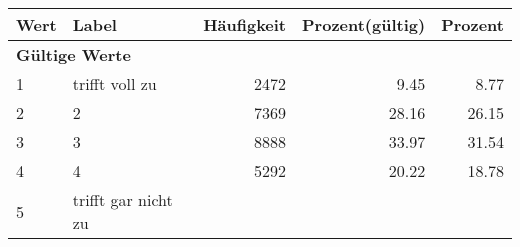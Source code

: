      \begin{longtable}{lXrrr}
     \toprule
     \textbf{Wert} & \textbf{Label} & \textbf{Häufigkeit} & \textbf{Prozent(gültig)} & \textbf{Prozent} \\
     \endhead
     \midrule
     \multicolumn{5}{l}{\textbf{Gültige Werte}}\\

     1 &
     \multicolumn{1}{X}{ trifft voll zu   } &


       \num{2472} &
       \num[round-mode=places,round-precision=2]{9,45} &
         \num[round-mode=places,round-precision=2]{8,77} \\

     2 &
     \multicolumn{1}{X}{ 2   } &


       \num{7369} &
       \num[round-mode=places,round-precision=2]{28,16} &
         \num[round-mode=places,round-precision=2]{26,15} \\

     3 &
     \multicolumn{1}{X}{ 3   } &


       \num{8888} &
       \num[round-mode=places,round-precision=2]{33,97} &
         \num[round-mode=places,round-precision=2]{31,54} \\

     4 &
     \multicolumn{1}{X}{ 4   } &


       \num{5292} &
       \num[round-mode=places,round-precision=2]{20,22} &
         \num[round-mode=places,round-precision=2]{18,78} \\

     5 &
     \multicolumn{1}{X}{ trifft gar nicht zu   } &



\end{longtable}
